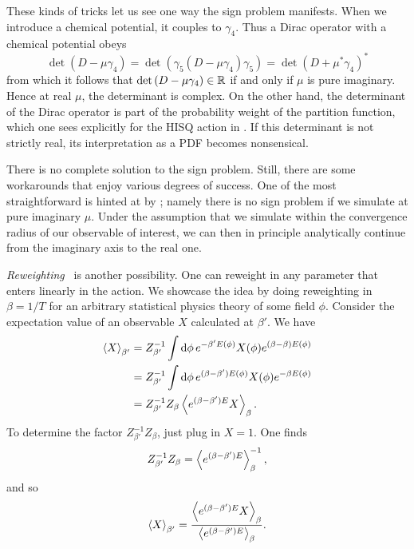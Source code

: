 These kinds of tricks let us see one way the sign problem manifests.
When we introduce a chemical potential, it couples to $\gamma_4$.
Thus a Dirac operator with a chemical potential obeys
\begin{equation}\label{eq:signproblem}
\det\left(D-\mu\gamma_4\right)
=\det\left(\gamma_5\left(D-\mu\gamma_4\right)\gamma_5\right)
=\det\left(D+\mu^*\gamma_4\right)^*
\end{equation}
from which it follows that
$\det\left(D-\mu\gamma_4\right)\in\mathbb{R}$ if and only if $\mu$
is pure imaginary. Hence at real $\mu$, the determinant
is complex. On the other hand, the determinant of the
Dirac operator is part of the probability weight
of the partition function, which one sees explicitly for
the HISQ action in . If this
determinant is not strictly real, its interpretation
as a PDF becomes nonsensical.

There is no complete solution to the sign problem. Still, there are
some workarounds that enjoy various degrees of success.
One of the most straightforward is hinted at by
; namely there is no sign problem
if we simulate at pure imaginary $\mu$. Under the assumption
that we simulate within the convergence radius of our
observable of interest, we can then in principle analytically
continue from the imaginary axis to the real one.

{\it Reweighting}~\cite{ferrenberg_new_1989}
is another possibility. One can reweight in any parameter that
enters linearly in the action. 
We showcase the idea by doing reweighting in $\beta=1/T$ for
an arbitrary statistical physics theory of some field $\phi$. Consider
the expectation value of an observable $X$ calculated at $\beta'$. We have
\begin{equation}
\begin{aligned}
  \ev{X}_{\beta'}&=Z_{\beta'}^{-1}\int\dd{\phi}e^{-\beta'E(\phi)}X(\phi)
                  e^{(\beta-\beta)E(\phi)}\\
                 &=Z_{\beta'}^{-1}\int\dd{\phi}e^{(\beta-\beta')E(\phi)}
                  X(\phi)e^{-\beta E(\phi)}\\
                 &=Z_{\beta'}^{-1}Z_{\beta}\ev{e^{(\beta-\beta')E}X}_\beta.
\end{aligned}
\end{equation}
To determine the factor $Z_{\beta'}^{-1}Z_{\beta}$, just plug in $X=1$.
One finds
\begin{equation}
Z_{\beta'}^{-1}Z_{\beta}=\ev{e^{(\beta-\beta')E}}_{\beta}^{-1},
\end{equation}
and so
\begin{equation}\label{eq:RW}
\ev{X}_{\beta'}=\frac{\ev{e^{(\beta-\beta')E}X}_\beta}{\ev{e^{(\beta-\beta')E}}_{\beta}}.
\end{equation}


